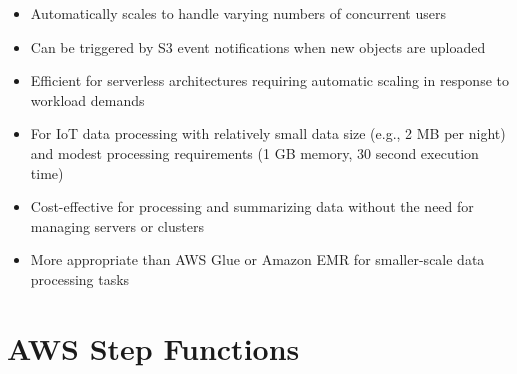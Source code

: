 \documentclass[11pt,a4paper]{report}
\begin{document}
\begin{itemize}
\begin{itemize}
  \item Automatically scales to handle varying numbers of concurrent users
  \item Can be triggered by S3 event notifications when new objects are uploaded
  \item Efficient for serverless architectures requiring automatic scaling in response to workload demands
  \item For IoT data processing with relatively small data size (e.g., 2 MB per night) and modest processing requirements (1 GB memory, 30 second execution time)
  \item Cost-effective for processing and summarizing data without the need for managing servers or clusters
  \item More appropriate than AWS Glue or Amazon EMR for smaller-scale data processing tasks
\end{itemize}
\end{itemize}

\section{AWS Step Functions}
\end{document}
